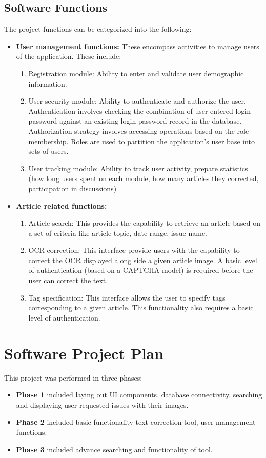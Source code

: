 \documentclass[12pt]{article}
\begin{document}
\subsection{Software Functions}
The project functions can be categorized into the following:
\begin{itemize}
\item \textbf{User management functions:} These encompass activities to manage users of the application.  These include: 
\begin{enumerate}
\item Registration module: Ability to enter and validate user demographic information.
\item User security module: Ability to authenticate and authorize the user.
Authentication involves checking the combination of user entered login-password against an existing login-password record in the database.
Authorization strategy involves accessing operations based on the role membership. Roles are used to partition the application's user base into sets of users.
\item User tracking module: Ability to track user activity, prepare statistics (how long users spent on each module, how many articles they corrected, participation in discussions)
\end{enumerate}
\item \textbf{Article related functions:} 
\begin{enumerate}
\item Article search: This provides the capability to retrieve an article based on a set of criteria like article topic, date range, issue name. 
\item OCR correction: This interface provide users with the capability to correct the OCR displayed along side a given article image.  A basic level of authentication (based on a CAPTCHA model) is required before the user can correct the text. 
\item Tag specification: This interface allows the user to specify tags corresponding to a given article.  This functionality also requires a basic level of authentication. 
\end{enumerate}

\end{itemize}
\section{Software Project Plan}
\label{sec:plan}
This project was performed in three phases: 
\begin{itemize}
\item \textbf{Phase 1} included laying out UI components, database connectivity, searching and displaying user requested issues with their images.
\item \textbf{Phase 2} included basic functionality text correction tool, user management functions. 
\item \textbf{Phase 3} included advance searching and functionality of tool.
\end{itemize}
\end{document}
